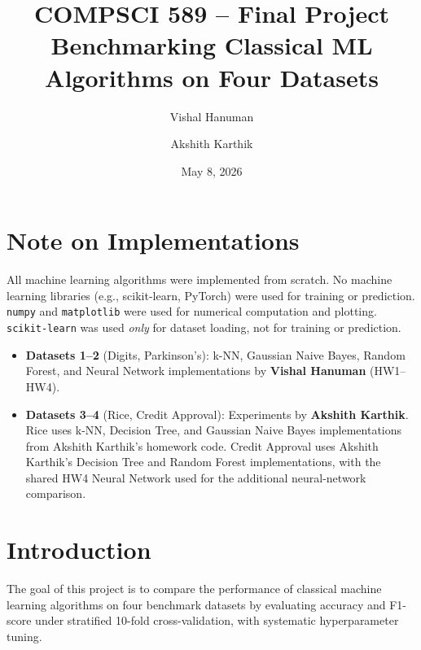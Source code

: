 \documentclass[11pt]{article}
\title{COMPSCI 589 -- Final Project\\[0.5em]
       \large Benchmarking Classical ML Algorithms on Four Datasets}
\author{Vishal Hanuman \and Akshith Karthik}
\date{May 8, 2026}
\begin{document}
\maketitle

\section*{Note on Implementations}

All machine learning algorithms were implemented from scratch.
No machine learning libraries (e.g., scikit-learn, PyTorch) were used for training or prediction.
\texttt{numpy} and \texttt{matplotlib} were used for numerical computation and plotting.
\texttt{scikit-learn} was used \emph{only} for dataset loading, not for training
or prediction.

\begin{itemize}
  \item \textbf{Datasets 1--2} (Digits, Parkinson's):
        k-NN, Gaussian Naive Bayes, Random Forest, and Neural Network implementations
        by \textbf{Vishal Hanuman} (HW1--HW4).
  \item \textbf{Datasets 3--4} (Rice, Credit Approval):
        Experiments by \textbf{Akshith Karthik}. Rice uses k-NN, Decision Tree, and
        Gaussian Naive Bayes implementations from Akshith Karthik's homework code.
        Credit Approval uses Akshith Karthik's Decision Tree and Random Forest
        implementations, with the shared HW4 Neural Network used for the additional
        neural-network comparison.
\end{itemize}

\section{Introduction}

The goal of this project is to compare the performance of classical machine learning algorithms
on four benchmark datasets by evaluating accuracy and F1-score under stratified 10-fold
cross-validation, with systematic hyperparameter tuning.
\end{document}
